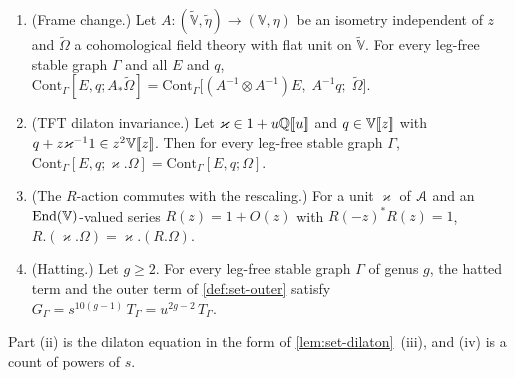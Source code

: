 \begin{lem}
\label{lem:flh-hat}
\begin{enumerate}
\item (Frame change.) Let $A\colon(\widetilde{\mathbb V},\tilde\eta)\to(\mathbb V,\eta)$ be an isometry independent of $z$ and $\widetilde\Omega$ a cohomological field theory with flat unit on $\widetilde{\mathbb V}$. For every leg-free stable graph $\Gamma$ and all $E$ and $q$, $\mathrm{Cont}_\Gamma[E,q;A_*\widetilde\Omega]=\mathrm{Cont}_\Gamma\bigl[(A^{-1}\otimes A^{-1})E,\;A^{-1}q;\;\widetilde\Omega\bigr]$.
\item (TFT dilaton invariance.) Let $\varkappa\in1+u\mathbb{Q}[\![ u ]\!]$ and $q\in\mathbb V[\![ z ]\!]$ with $q+z\varkappa^{-1}1\in z^2\mathbb V[\![ z ]\!]$. Then for every leg-free stable graph $\Gamma$, $\mathrm{Cont}_\Gamma[E,q;\varkappa.\Omega]=\mathrm{Cont}_\Gamma[E,q;\Omega]$.
\item (The $R$-action commutes with the rescaling.) For a unit $\varkappa$ of $\mathcal{A}$ and an $\operatorname{End}(\mathbb V)$-valued series $R(z)=1+O(z)$ with $R(-z)^*R(z)=1$, $R.(\varkappa.\Omega)=\varkappa.(R.\Omega)$.
\item (Hatting.) Let $g\geq2$. For every leg-free stable graph $\Gamma$ of genus $g$, the hatted term and the outer term of \cref{def:set-outer} satisfy $G_\Gamma=s^{10(g-1)}\,T_\Gamma=u^{2g-2}\,T_\Gamma$.
\end{enumerate}
\end{lem}

Part (ii) is the dilaton equation in the form of \cref{lem:set-dilaton}~(iii), and (iv) is a count of powers of $s$.

